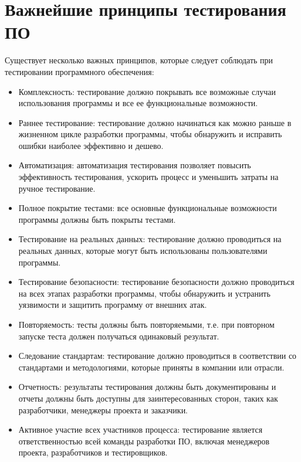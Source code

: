 \section{Важнейшие принципы тестирования ПО}
Существует несколько важных принципов, которые следует соблюдать при тестировании программного обеспечения:
    \begin{itemize}
    \item Комплексность: тестирование должно покрывать все возможные случаи использования программы и все ее функциональные возможности.

    \item Раннее тестирование: тестирование должно начинаться как можно раньше в жизненном цикле разработки программы, чтобы обнаружить и исправить ошибки наиболее эффективно и дешево.

    \item Автоматизация: автоматизация тестирования позволяет повысить эффективность тестирования, ускорить процесс и уменьшить затраты на ручное тестирование.

    \item Полное покрытие тестами: все основные функциональные возможности программы должны быть покрыты тестами.

    \item Тестирование на реальных данных: тестирование должно проводиться на реальных данных, которые могут быть использованы пользователями программы.

    \item Тестирование безопасности: тестирование безопасности должно проводиться на всех этапах разработки программы, чтобы обнаружить и устранить уязвимости и защитить программу от внешних атак.

    \item Повторяемость: тесты должны быть повторяемыми, т.е. при повторном запуске теста должен получаться одинаковый результат.

    \item Следование стандартам: тестирование должно проводиться в соответствии со стандартами и методологиями, которые приняты в компании или отрасли.

    \item Отчетность: результаты тестирования должны быть документированы и отчеты должны быть доступны для заинтересованных сторон, таких как разработчики, менеджеры проекта и заказчики.

    \item Активное участие всех участников процесса: тестирование является ответственностью всей команды разработки ПО, включая менеджеров проекта, разработчиков и тестировщиков.
    \end{itemize}
